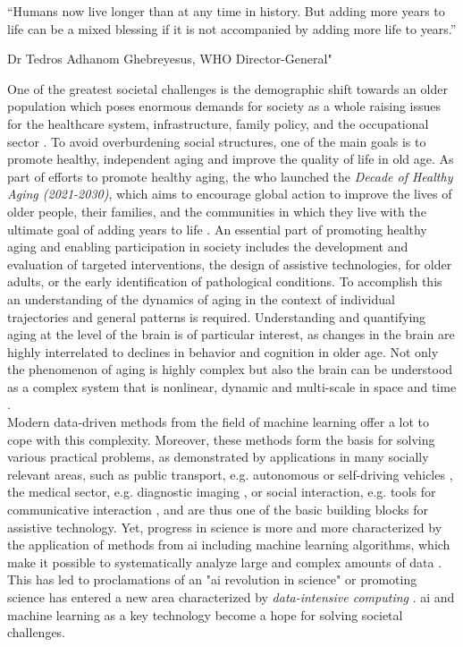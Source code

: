 \setlength{\epigraphwidth}{0.6\textwidth}
\epigraph{\centering “Humans now live longer than at any time in history. But adding more years to life can be a mixed blessing if it is not accompanied by adding more life to years.”} {Dr Tedros Adhanom Ghebreyesus, WHO Director-General"}

One of the greatest societal challenges is the demographic shift towards an older population which poses enormous demands for society as a whole raising issues for the healthcare system, infrastructure, family policy, and the occupational sector \cite{who_aging2023}. To avoid overburdening social structures, one of the main goals is to promote healthy, independent aging and improve the quality of life in old age. As part of efforts to promote healthy aging, the \gls{who} launched the \textit{Decade of Healthy Aging (2021-2030)}, which aims to encourage global action to improve the lives of older people, their families, and the communities in which they live with the ultimate goal of adding years to life \cite{who_aging2023}. An essential part of promoting healthy aging and enabling participation in society includes the development and evaluation of targeted interventions, the design of assistive technologies, for older adults, or the early identification of pathological conditions. To accomplish this an understanding of the dynamics of aging in the context of individual trajectories and general patterns is required. Understanding and quantifying aging at the level of the brain is of particular interest, as changes in the brain are highly interrelated to declines in behavior and cognition in older age. Not only the phenomenon of aging is highly complex but also the brain can be understood as a complex system that is nonlinear, dynamic and multi-scale in space and time \cite{Betzel2017}.\\ 
Modern data-driven methods from the field of machine learning offer a lot to cope with this complexity. Moreover, these methods form the basis for solving various practical problems, as demonstrated by applications in many socially relevant areas, such as public transport, e.g. autonomous or self-driving vehicles \cite{Leonard2020}, the medical sector, e.g. diagnostic imaging \cite{Liu2020}, or social interaction, e.g. tools for communicative interaction \cite{Adamopoulou2020}, and are thus one of the basic building blocks for assistive technology. Yet, progress in science is more and more characterized by the application of methods from \gls{ai} including machine learning algorithms, which make it possible to systematically analyze large and complex amounts of data \cite{Brunton2019}. This has led to proclamations of an "\gls{ai} revolution in science" \cite{Appenzeller2017} or promoting science has entered a new area characterized by \textit{data-intensive computing} \cite{Hey2009}. \Gls{ai} and machine learning as a key technology become a hope for solving societal challenges.\\ 
